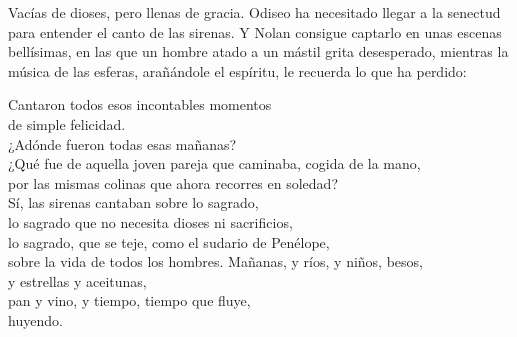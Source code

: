 Vacías de dioses, pero llenas de gracia. Odiseo ha necesitado llegar a la senectud para entender el canto de las sirenas. Y Nolan consigue captarlo en unas escenas bellísimas, en las que un hombre atado a un mástil grita desesperado, mientras la música de las esferas, arañándole el espíritu, le recuerda lo que ha perdido:

\begin{versopropio}
Cantaron todos esos incontables momentos\\
de simple felicidad.\\
¿Adónde fueron todas esas mañanas?\\
¿Qué fue de aquella joven pareja que caminaba, cogida de la mano,\\
por las mismas colinas que ahora recorres en soledad?\\
Sí, las sirenas cantaban sobre lo sagrado,\\
lo sagrado que no necesita dioses ni sacrificios,\\
lo sagrado, que se teje, como el sudario de Penélope,\\
sobre la vida de todos los hombres. Mañanas, y ríos, y niños, besos,\\
y estrellas y aceitunas,\\
pan y vino, y tiempo, tiempo que fluye,\\
huyendo.
\end{versopropio}
